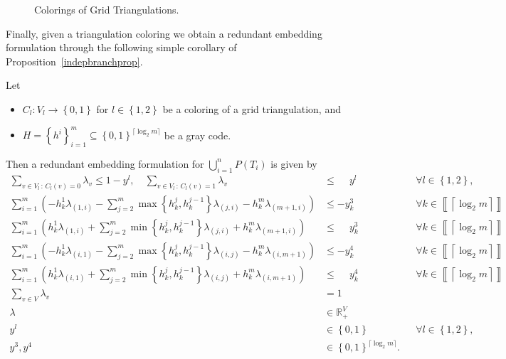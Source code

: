 \documentclass[mnsc]{informs3}
\newcommand{\set}[1]{\left\{#1\right\}}                     %
\newcommand{\bra}[1]{\left(#1\right)}
\newcommand{\sidx}[1]{\left\llbracket     #1 \right\rrbracket}
\newcommand{\Real}{\mathbb R}
\begin{document}
\begin{figure}[htpb]
  \begin{center}
  \end{center}
  \caption{Colorings of Grid Triangulations.}\label{triag3}
  \end{figure}

Finally, given a triangulation coloring we obtain a redundant embedding formulation through the following simple corollary of Proposition~\ref{indepbranchprop}.

\begin{corollary}\label{generalpwlprop} Let 
\begin{itemize}
\item $C_l:V_l\to  \set{0,1}$ for $l\in\set{1,2}$ be a coloring of a grid triangulation, and 
\item $H=\set{h^i}_{i=1}^m\subseteq \set{0,1}^{\lceil \log_2 m\rceil}$ be a gray code.
\end{itemize}
 Then a redundant embedding formulation for $\bigcup_{i=1}^n P\bra{T_i}$ is given by 
 \begin{subequations}\label{smalembpwl2d}
 \begin{alignat}{3}
  \sum\nolimits_{v \in V_l\,:\, C_l(v)=0} \lambda_{v}\leq 1-y^l,\quad
  \sum\nolimits_{v \in V_l\,:\, C_l(v)=1} \lambda_{v}&\leq \phantom{-}y^l&& \forall l\in \set{1,2},\label{smalembpwl2d2}\\
    \label{ggg1}\sum\nolimits_{i=1}^m\bra{-h^1_k\lambda_{\bra{1,i}}-\sum\nolimits_{j=2}^{m} \max\set{h^j_k,h^{j-1}_k}\lambda_{\bra{j,i}}-h^m_k\lambda_{\bra{m+1,i}}}& \leq -y_k^3 &&\forall k \in \sidx{\left\lceil \log_2 m\right\rceil}\\
\sum\nolimits_{i=1}^m\bra{h^1_k\lambda_{\bra{1,i}}+\sum\nolimits_{j=2}^{m} \min\set{h^j_k,h^{j-1}_k}\lambda_{\bra{j,i}} +h^m_k\lambda_{\bra{m+1,i}}}& \leq \phantom{-}y_k^3 &&\forall k \in \sidx{\left\lceil \log_2 m\right\rceil}\\
  \label{ggg2}\sum\nolimits_{i=1}^m\bra{-h^1_k\lambda_{\bra{i,1}}-\sum\nolimits_{j=2}^{m} \max\set{h^j_k,h^{j-1}_k}\lambda_{\bra{i,j}}-h^m_k\lambda_{\bra{i,m+1}}}& \leq -y_k^4 &&\forall k \in \sidx{\left\lceil \log_2 m\right\rceil}\\
\sum\nolimits_{i=1}^m\bra{h^1_k\lambda_{\bra{i,1}}+\sum\nolimits_{j=2}^{m} \min\set{h^j_k,h^{j-1}_k}\lambda_{\bra{i,j}} +h^m_k\lambda_{\bra{i,m+1}}}& \leq \phantom{-}y_k^4 &&\forall k \in \sidx{\left\lceil \log_2 m\right\rceil}\\
 \sum\nolimits_{v\in V} \lambda_v &=1 \\
 \lambda &\in \Real_+^V\\
  y^l&\in \set{0,1} && \forall l\in \set{1,2},\\
 y^3,y^4&\in \set{0,1}^{\lceil \log_2 m\rceil}.
 \end{alignat}
 \end{subequations}
 \end{corollary}
\end{document}
